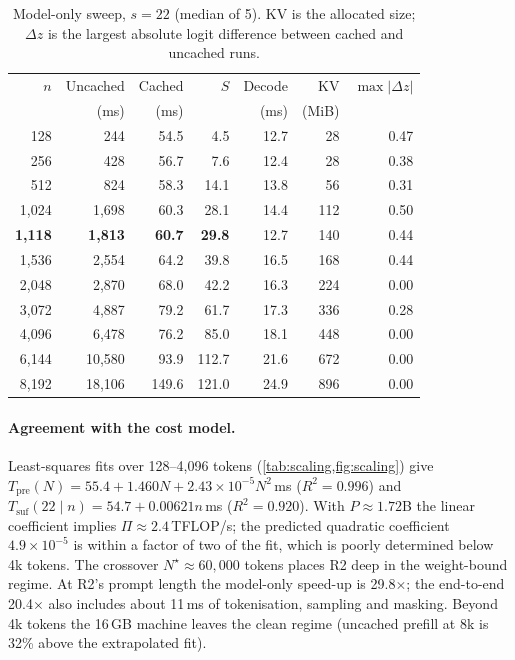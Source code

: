 \documentclass[10pt,twocolumn,letterpaper]{article}
\theoremstyle{definition}
\begin{document}
\begin{table}[t]
\centering\small
\caption{Model-only sweep, $s=22$ (median of 5). KV is the allocated size; $\Delta z$ is the
largest absolute logit difference between cached and uncached runs.}
\label{tab:scaling}
\setlength{\tabcolsep}{3pt}
\begin{tabular}{@{}rrrrrrr@{}}
\toprule
$n$ & Uncached & Cached & $S$ & Decode & KV & $\max|\Delta z|$ \\
 & (ms) & (ms) & & (ms) & (MiB) & \\
\midrule
128 & 244 & 54.5 & 4.5 & 12.7 & 28 & 0.47 \\
256 & 428 & 56.7 & 7.6 & 12.4 & 28 & 0.38 \\
512 & 824 & 58.3 & 14.1 & 13.8 & 56 & 0.31 \\
1{,}024 & 1{,}698 & 60.3 & 28.1 & 14.4 & 112 & 0.50 \\
\textbf{1{,}118} & \textbf{1{,}813} & \textbf{60.7} & \textbf{29.8} & 12.7 & 140 & 0.44 \\
1{,}536 & 2{,}554 & 64.2 & 39.8 & 16.5 & 168 & 0.44 \\
2{,}048 & 2{,}870 & 68.0 & 42.2 & 16.3 & 224 & 0.00 \\
3{,}072 & 4{,}887 & 79.2 & 61.7 & 17.3 & 336 & 0.28 \\
4{,}096 & 6{,}478 & 76.2 & 85.0 & 18.1 & 448 & 0.00 \\
6{,}144 & 10{,}580 & 93.9 & 112.7 & 21.6 & 672 & 0.00 \\
8{,}192 & 18{,}106 & 149.6 & 121.0 & 24.9 & 896 & 0.00 \\
\bottomrule
\end{tabular}
\end{table}

\paragraph{Agreement with the cost model.}
Least-squares fits over 128--4{,}096 tokens (\cref{tab:scaling,fig:scaling}) give
$T_{\text{pre}}(N)=55.4+1.460N+2.43{\times}10^{-5}N^2$\,ms ($R^2=0.996$) and
$T_{\text{suf}}(22\mid n)=54.7+0.00621n$\,ms ($R^2=0.920$). With $P\approx1.72$B the linear
coefficient implies $\Pi\approx2.4$\,TFLOP/s; the predicted quadratic coefficient
$4.9{\times}10^{-5}$ is within a factor of two of the fit, which is poorly determined below 4k
tokens. The crossover $N^\star\approx60{,}000$ tokens places R2 deep in the weight-bound regime.
At R2's prompt length the model-only speed-up is 29.8$\times$; the end-to-end 20.4$\times$ also
includes about 11\,ms of tokenisation, sampling and masking. Beyond 4k tokens the 16\,GB machine
leaves the clean regime (uncached prefill at 8k is 32\% above the extrapolated fit).
\end{document}
